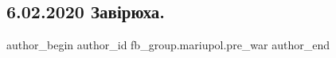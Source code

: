  
 
 
 
 

\subsection{6.02.2020 Завірюха.}
\label{sec:06_02_2023.fb.fb_group.mariupol.pre_war.1.6_02_2020_zav_ryukha}

\ifcmt
 author_begin
   author_id fb_group.mariupol.pre_war
 author_end
\fi
